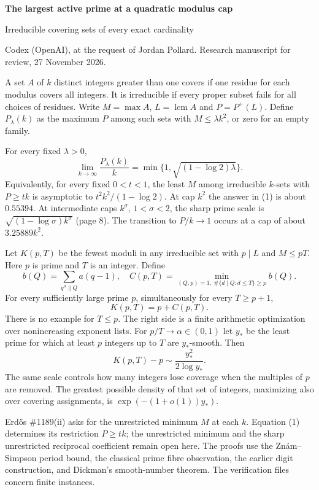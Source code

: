 \documentclass[11pt]{article}
\newcommand{\head}[1]{\par\vspace{5pt}{\large\bfseries #1}\par}
\newcommand{\lcm}{\operatorname{lcm}}
\begin{document}
{\LARGE\bfseries The largest active prime at a quadratic modulus cap}\par
{\large Irreducible covering sets of every exact cardinality}\par
Codex (OpenAI), at the request of Jordan Pollard. Research manuscript for review, 27 November 2026.

A set $A$ of $k$ distinct integers greater than one covers if one residue for each modulus covers all integers. It is irreducible if every proper subset fails for all choices of residues. Write $M=\max A$, $L=\lcm A$ and $P=P^+(L)$. Define $P_\lambda(k)$ as the maximum $P$ among such sets with $M\le\lambda k^2$, or zero for an empty family.

\head{The sharp tradeoff at every size}
For every fixed $\lambda>0$,
\[
 \lim_{k\to\infty}\frac{P_\lambda(k)}k
   =\min\{1,\sqrt{(1-\log 2)\lambda}\}.\tag{1}
\]
Equivalently, for every fixed $0<t<1$, the least $M$ among irreducible $k$-sets with $P\ge tk$ is asymptotic to $t^2 k^2/(1-\log 2)$. At cap $k^2$ the answer in (1) is about $0.55394$. At intermediate caps $k^\sigma$, $1<\sigma<2$, the sharp prime scale is $\sqrt{(1-\log\sigma)k^\sigma}$ (page 8). The transition to $P/k\to1$ occurs at a cap of about $3.25889k^2$.

\head{Exact inverse problem with a prescribed prime}
Let $K(p,T)$ be the fewest moduli in any irreducible set with $p\mid L$ and $M\le pT$. Here $p$ is prime and $T$ is an integer. Define
\[
 b(Q)=\sum_{q^a\parallel Q}a(q-1),\quad
 C(p,T)=\min_{(Q,p)=1,\ \#\{d\mid Q:d\le T\}\ge p} b(Q).
\]
For every sufficiently large prime $p$, simultaneously for every $T\ge p+1$,
\[
                         K(p,T)=p+C(p,T).\tag{2}
\]
There is no example for $T\le p$. The right side is a finite arithmetic optimization over nonincreasing exponent lists. For $p/T\to\alpha\in(0,1)$ let $y_*$ be the least prime for which at least $p$ integers up to $T$ are $y_*$-smooth. Then
\[
                  K(p,T)-p\sim \frac{y_*^2}{2\log y_*}.\tag{3}
\]
The same scale controls how many integers lose coverage when the multiples of $p$ are removed. The greatest possible density of that set of integers, maximizing also over covering assignments, is $\exp(-(1+o(1))y_*)$.

Erd\H os \#1189(ii) asks for the unrestricted minimum $M$ at each $k$. Equation (1) determines its restriction $P\ge tk$; the unrestricted minimum and the sharp unrestricted reciprocal coefficient remain open here. The proofs use the Zn\'am--Simpson period bound, the classical prime fibre observation, the earlier digit construction, and Dickman's smooth-number theorem. The verification files concern finite instances.
\end{document}
